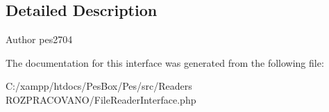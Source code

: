 \subsection{Detailed Description}
\begin{DoxyAuthor}{Author}
pes2704 
\end{DoxyAuthor}


The documentation for this interface was generated from the following file\+:\begin{DoxyCompactItemize}
\item 
C\+:/xampp/htdocs/\+Pes\+Box/\+Pes/src/\+Readers R\+O\+Z\+P\+R\+A\+C\+O\+V\+A\+N\+O/File\+Reader\+Interface.\+php\end{DoxyCompactItemize}
